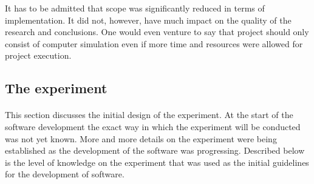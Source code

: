 \documentclass[11pt,english]{article}
\begin{document}
It has to be admitted that scope was significantly reduced in terms of implementation. It did not, however, have much impact on the quality of the research and conclusions. One would even venture to say that project should only consist of computer simulation even if more time and resources were allowed for project execution. 




\subsection{The experiment}

\paragraph{}

This section discusses the initial design of the experiment. At the start of the software development the exact way in which the experiment will be conducted was not yet known. More and more details on the experiment were being established as the development of the software was progressing. Described below is the level of knowledge on the experiment that was used as the initial guidelines for the development of software.

\par
















\end{document}
